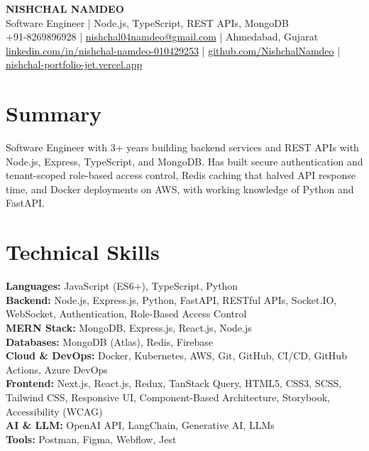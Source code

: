\documentclass[a4paper,10pt]{article}
\begin{document}
\begin{center}
  {\LARGE \textbf{NISHCHAL NAMDEO}}\\[3pt]
  Software Engineer | Node.js, TypeScript, REST APIs, MongoDB\\[3pt]
  +91-8269896928 | \href{mailto:nishchal04namdeo@gmail.com}{nishchal04namdeo@gmail.com} | Ahmedabad, Gujarat\\[2pt]
  \href{https://www.linkedin.com/in/nishchal-namdeo-010429253/}{linkedin.com/in/nishchal-namdeo-010429253} |
  \href{https://github.com/NishchalNamdeo}{github.com/NishchalNamdeo} |
  \href{https://nishchal-portfolio-jet.vercel.app/}{nishchal-portfolio-jet.vercel.app}
\end{center}

\section{Summary}
Software Engineer with 3+ years building backend services and REST APIs with Node.js, Express, TypeScript, and MongoDB. Has built secure authentication and tenant-scoped role-based access control, Redis caching that halved API response time, and Docker deployments on AWS, with working knowledge of Python and FastAPI.

\section{Technical Skills}
\textbf{Languages:} JavaScript (ES6+), TypeScript, Python\\
\textbf{Backend:} Node.js, Express.js, Python, FastAPI, RESTful APIs, Socket.IO, WebSocket, Authentication, Role-Based Access Control\\
\textbf{MERN Stack:} MongoDB, Express.js, React.js, Node.js\\
\textbf{Databases:} MongoDB (Atlas), Redis, Firebase\\
\textbf{Cloud \& DevOps:} Docker, Kubernetes, AWS, Git, GitHub, CI/CD, GitHub Actions, Azure DevOps\\
\textbf{Frontend:} Next.js, React.js, Redux, TanStack Query, HTML5, CSS3, SCSS, Tailwind CSS, Responsive UI, Component-Based Architecture, Storybook, Accessibility (WCAG)\\
\textbf{AI \& LLM:} OpenAI API, LangChain, Generative AI, LLMs\\
\textbf{Tools:} Postman, Figma, Webflow, Jest
\end{document}
